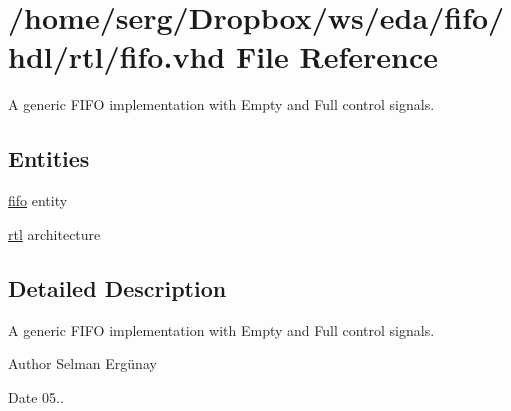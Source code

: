 \hypertarget{fifo_8vhd}{}\section{/home/serg/\+Dropbox/ws/eda/fifo/hdl/rtl/fifo.vhd File Reference}
\label{fifo_8vhd}


A generic F\+I\+FO implementation with Empty and Full control signals.  


\subsection*{Entities}
\begin{DoxyCompactItemize}
\item 
\hyperlink{classfifo}{fifo} entity
\item 
\hyperlink{classfifo_1_1rtl}{rtl} architecture
\end{DoxyCompactItemize}


\subsection{Detailed Description}
A generic F\+I\+FO implementation with Empty and Full control signals. 

\begin{DoxyAuthor}{Author}
Selman Ergünay 
\end{DoxyAuthor}
\begin{DoxyDate}{Date}
05.. 
\end{DoxyDate}
